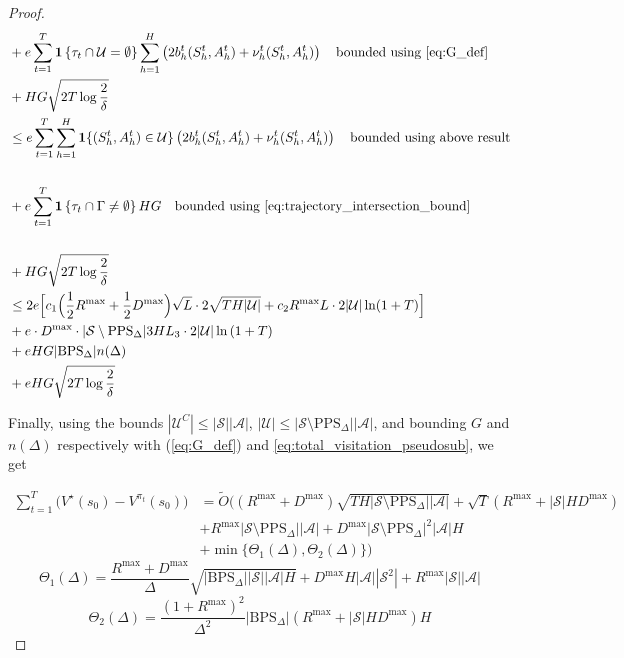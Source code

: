 \documentclass[twoside]{article}
\newcommand{\BPS}{\mathrm{BPS}_{\Delta}} %
\newcommand{\PPS}{\mathrm{PPS}_{\Delta}} %
\begin{document}
\begin{proof}
\begin{align*}
    &+ e \sum_{t=1}^{T} \mathbf{1}\left\{\tau_{t}\cap \mathcal{U}=\emptyset\right\}\sum_{h=1}^{H} \left(2b_h^{t}(S_h^t,A_h^t)+ \nu_h^{t}(S_h^t,A_h^t)\right) \quad\text{bounded using \eqref{eq:G_def}}\\
    &+HG\sqrt{2T\log \frac{2}{\delta}}\\
    &\le e \sum_{t=1}^{T}\sum_{h=1}^{H}
\mathbf{1}\{(S_h^t,A_h^t)\in\mathcal{U}\} \left(2b_h^{t}(S_h^t,A_h^t)+ \nu_h^{t}(S_h^t,A_h^t)\right) \quad\text{bounded using above result}\\
\\
    &+ e \sum_{t=1}^{T} \mathbf{1}\left\{\tau_{t}\cap\Gamma\neq\emptyset\right\}HG\quad\text{bounded using \eqref{eq:trajectory_intersection_bound}}\\
\\
    &+HG\sqrt{2T\log \frac{2}{\delta}}\\
    &\le 2e\Big[c_1\Big(\dfrac12R^{\max}+\dfrac12 D^{\max}\Big)\sqrt{L}\cdot 2\sqrt{TH|\mathcal{U}|}
+ c_2R^{\max}L\cdot 2|\mathcal{U}|\ln(1+T)\Big]\\
    &+ e\cdot D^{\max}\cdot
|\mathcal{S}\setminus \PPS| 3HL_3\cdot 2 |\mathcal{U}|\ln{(1+T)}\\
    &+ eHG|\BPS| n(\Delta)\\
    &+eHG\sqrt{2T\log \frac{2}{\delta}}\\
\end{align*}

Finally, using the bounds $|\mathcal{U}^{C}| \leq |\mathcal{S}||\mathcal{A}|$,
$|\mathcal{U}|\le|\mathcal{S}\setminus \PPS||\mathcal{A}|$,
and bounding $G$ and $n(\Delta)$ respectively with (\ref{eq:G_def}) and \eqref{eq:total_visitation_pseudosub}, we get 

\begin{align*}
\sum_{t=1}^{T}\bigl(V^{\star}(s_{0})-V^{\pi_{t}}(s_{0})\bigr)
& =\tilde O\Big(
(R^{\max}+D^{\max})\sqrt{T H |\mathcal{S}\setminus \PPS| |\mathcal{A}|}
+\sqrt{T}(R^{\max}+|\mathcal{S}| H D^{\max}) \\
& + R^{\max} |\mathcal{S}\setminus \PPS| |\mathcal{A}| + D^{\max} |\mathcal{S}\setminus \PPS|^2 |\mathcal{A}| H\\
& + \min\{\Theta_{1}(\Delta),\Theta_{2}(\Delta)\}
\Big)
\end{align*}
\[
\Theta_{1}(\Delta)=\dfrac{R^{\max}+D^{\max}}{\Delta}\sqrt{|\BPS||\mathcal{S}| |\mathcal{A}|H} + D^{\max}H|\mathcal{A}||\mathcal{S}^2| + R^{\max}|\mathcal{S}||\mathcal{A|}
\]
\[
\Theta_{2}(\Delta)=\dfrac{(1 + R^{\max})^2}{\Delta^2}|\BPS|(R^{\max}+|\mathcal{S}| H D^{\max})H
\]
\end{proof}
\end{document}
